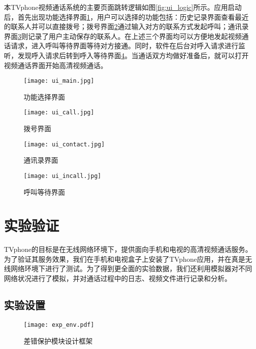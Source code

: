 本TVphone视频通话系统的主要页面跳转逻辑如图\ref{fig:ui_logic}所示。应用启动后，首先出现功能选择界面\ref{fig:ui_main}，用户可以选择的功能包括：历史记录界面查看最近的联系人并可以直接拨号；拨号界面\ref{fig:ui_call}通过输入对方的联系方式发起呼叫；通讯录界面\ref{fig:ui_contact}则记录了用户主动保存的联系人。在上述三个界面均可以方便地发起视频通话请求，进入呼叫等待界面等待对方接通。同时，软件在后台对呼入请求进行监听，发现呼入请求后转到呼入等待界面\ref{fig:ui_incall}。当通话双方均做好准备后，就可以打开视频通话界面开始高清视频通话。

\begin{figure}[htbp]
  \centering
  \texttt{[image: ui\_main.jpg]}
  \caption{功能选择界面}
  \label{fig:ui_main}
\end{figure}

\begin{figure}[htbp]
  \centering
  \texttt{[image: ui\_call.jpg]}
  \caption{拨号界面}
  \label{fig:ui_call}
\end{figure}

\begin{figure}[htbp]
  \centering
  \texttt{[image: ui\_contact.jpg]}
  \caption{通讯录界面}
  \label{fig:ui_contact}
\end{figure}

\begin{figure}[htbp]
  \centering
  \texttt{[image: ui\_incall.jpg]}
  \caption{呼叫等待界面}
  \label{fig:ui_incall}
\end{figure}

\section{实验验证}

TVphone的目标是在无线网络环境下，提供面向手机和电视的高清视频通话服务。为了验证其服务效果，我们在手机和电视盒子上安装了TVphone应用，并在真是无线网络环境下进行了测试。为了得到更全面的实验数据，我们还利用模拟器对不同网络状况进行了模拟，并对通话过程中的日志、视频文件进行记录和分析。

\subsection{实验设置}
\begin{figure}[htbp]
  \centering
  \texttt{[image: exp\_env.pdf]}
  \caption{差错保护模块设计框架}
  \label{fig:exp_env}
\end{figure}

